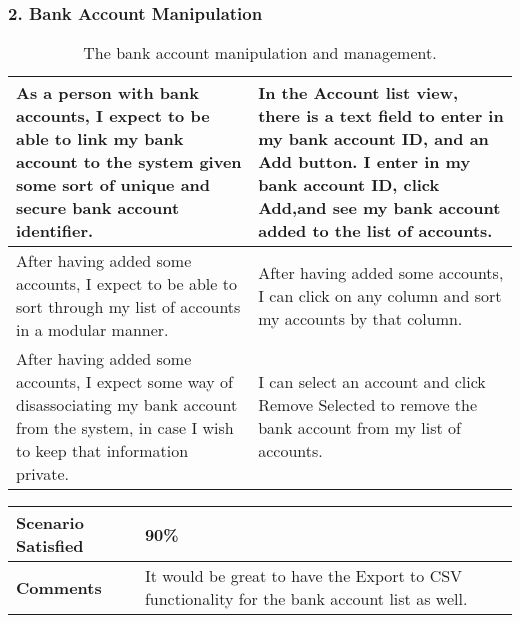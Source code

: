 \subsubsection{2. Bank Account Manipulation}
\begin{longtable}{|m{7cm}|l|} 
\caption[]{The bank account manipulation and management.} 
\\\hline 
\multicolumn{1}{|p{7cm}|}{As a person with bank accounts, I expect to be able to link my bank account to the system given some sort of unique and secure bank account identifier.} & \multicolumn{1}{p{7cm}|}{In the Account list view, there is a text field to enter in my bank account ID, and an Add button. I enter in my bank account ID, click Add,and see my bank account added to the list of accounts.}\\ \hline
\multicolumn{1}{|p{7cm}|}{After having added some accounts, I expect to be able to sort through my list of accounts in a modular manner.} & \multicolumn{1}{p{7cm}|}{After having added some accounts, I can click on any column and sort my accounts by that column.}\\ \hline
\multicolumn{1}{|p{7cm}|}{After having added some accounts, I expect some way of disassociating my bank account from the system, in case I wish to keep that information private.} & \multicolumn{1}{p{7cm}|}{I can select an account and click Remove Selected to remove the bank account from my list of accounts.}\\ \hline
\end{longtable}

\begin{longtable}{|m{4cm}|l|}\hline 
\cellcolor[HTML]{C0C0C0}\textbf{Scenario Satisfied} & \multicolumn{1}{p{13cm}|}{90\%}\\ \hline
\cellcolor[HTML]{C0C0C0}\textbf{Comments} & \multicolumn{1}{p{13cm}|}{It would be great to have the Export to CSV functionality for the bank account list as well.}\\ \hline
\end{longtable}


